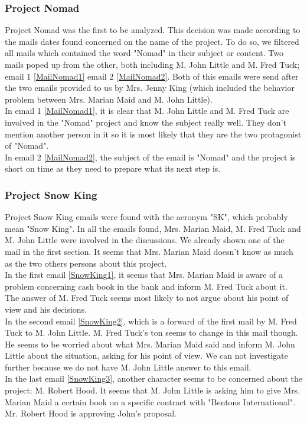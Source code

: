 \subsubsection{Project Nomad}
Project Nomad was the first to be analyzed. This decision was made according to the mails dates found concerned on the name of the project. To do so, we filtered all mails which contained the word "Nomad" in their subject or content. Two mails poped up from the other, both including M. John Little and M. Fred Tuck; email 1 \ref{MailNomad1} email 2 \ref{MailNomad2}. Both of this emails were send after the two emails provided to us by Mrs. Jenny King (which included the behavior problem between Mrs. Marian Maid and M. John Little).\\
In email 1 \ref{MailNomad1}, it is clear that M. John Little and M. Fred Tuck are involved in the "Nomad" project and know the subject really well. They don't mention another person in it so it is most likely that they are the two protagonist of "Nomad".\\
In email 2 \ref{MailNomad2}, the subject of the email is "Nomad" and the project is short on time as they need to prepare what its next step is.

\subsubsection{Project Snow King}
Project Snow King emails were found with the acronym "SK", which probably mean "Snow King". In all the emails found, Mrs. Marian Maid, M. Fred Tuck and M. John Little were involved in the discussions. We already shown one of the mail in the first section. It seems that Mrs. Marian Maid doesn't know as much as the two others persons about this project.\\
In the first email \ref{SnowKing1}, it seems that Mrs. Marian Maid is aware of a problem concerning cash book in the bank and inform M. Fred Tuck about it. The answer of M. Fred Tuck seems most likely to not argue about his point of view and his decisions.\\
In the second email \ref{SnowKing2}, which is a forward of the first mail by M. Fred Tuck to M. John Little. M. Fred Tuck's ton seems to change in this mail though. He seems to be worried about what Mrs. Marian Maid said and inform M. John Little about the situation, asking for his point of view. We can not investigate further because we do not have M. John Little answer to this email.\\
In the last email \ref{SnowKing3}, another character seems to be concerned about the project: M. Robert Hood. It seems that M. John Little is asking him to give Mrs. Marian Maid a certain book on a specific contract with "Bentons International". Mr. Robert Hood is approving John's proposal.